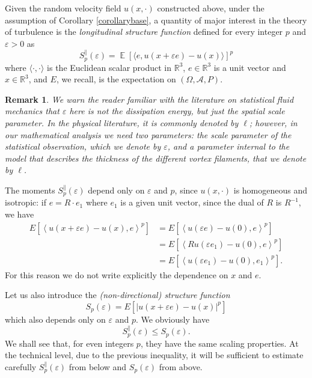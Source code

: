 \documentclass[a4paper,12pt]{article}
\DeclareMathOperator{\expect}{{\mathbb E}}
\newcommand{\eps}{\varepsilon}
\newtheorem{remark}{Remark}
\begin{document}
Given the random velocity field $u\left(  x,\cdot\right)  $ constructed above,
under the assumption of Corollary \ref{corollarybase}, a quantity of major
interest in the theory of turbulence is the \emph{longitudinal structure
function} defined for every integer $p$ and $\varepsilon>0$ as
\begin{equation}
S_{p}^{\parallel}(\varepsilon)=\expect[\langle e, u(x+\eps e) - u(x)\rangle
]^{p}%
\end{equation}
where $\langle\cdot,\cdot\rangle$ is the Euclidean scalar product in
$\mathbb{R}^{3}$, $e\in\mathbb{R}^{3}$ is a unit vector and $x\in
\mathbb{R}^{3}$, and $E$, we recall, is the expectation on $\left(
\Omega,\mathcal{A},P\right)  $.

\begin{remark}
\label{advert}We warn the reader familiar with the literature on statistical
fluid mechanics that $\varepsilon$ here is not the dissipation energy, but
just the spatial scale parameter. In the physical literature, it is commonly
denoted by $\ell$; however, in our mathematical analysis we need two
parameters: the scale parameter of the statistical observation, which we
denote by $\varepsilon$, and a parameter internal to the model that describes
the thickness of the different vortex filaments, that we denote by $\ell$.
\end{remark}

The moments $S_{p}^{\parallel}(\varepsilon)$ depend only on $\varepsilon$ and
$p$, since $u\left(  x,\cdot\right)  $ is homogeneous and isotropic: if
$e=R\cdot e_{1}$ where $e_{1}$ is a given unit vector, since the dual of $R$
is $R^{-1}$, we have
\begin{align*}
E\left[  \left\langle u(x+\varepsilon e)-u(x),e\right\rangle ^{p}\right]   &
=E\left[  \left\langle u(\varepsilon e)-u(0),e\right\rangle ^{p}\right] \\
&  =E\left[  \left\langle Ru(\varepsilon e_{1})-u(0),e\right\rangle
^{p}\right] \\
&  =E\left[  \left\langle u(\varepsilon e_{1})-u(0),e_{1}\right\rangle
^{p}\right]  .
\end{align*}
For this reason we do not write explicitly the dependence on $x$ and $e$.

Let us also introduce the \emph{(non-directional) structure function}
\[
S_{p}(\varepsilon)=E\left[  \left|  u(x+\varepsilon e)-u(x)\right|
^{p}\right]
\]
which also depends only on $\varepsilon$ and $p$. We obviously have
\[
S_{p}^{\parallel}(\varepsilon)\leq S_{p}(\varepsilon).
\]
We shall see that, for even integers $p$, they have the same scaling
properties. At the technical level, due to the previous inequality, it will be
sufficient to estimate carefully $S_{p}^{\parallel}(\varepsilon)$ from below
and $S_{p}(\varepsilon)$ from above.
\end{document}
